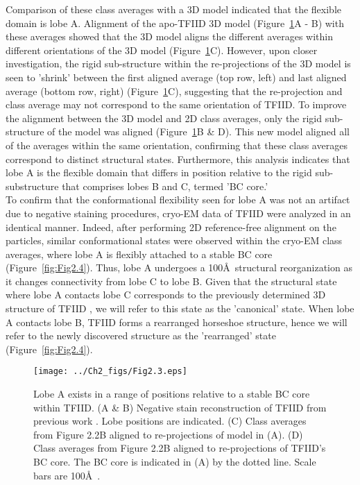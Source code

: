 \indent Comparison of these class averages with a 3D model indicated that the flexible domain is lobe A. Alignment of the apo-TFIID 3D model (Figure~\ref{fig:Fig2.3}A - B) with these averages showed that the 3D model aligns the different averages within different orientations of the 3D model (Figure~\ref{fig:Fig2.3}C). However, upon closer investigation, the rigid sub-structure within the re-projections of the 3D model is seen to 'shrink' between the first aligned average (top row, left) and last aligned average (bottom row, right) (Figure~\ref{fig:Fig2.3}C), suggesting that the re-projection and class average may not correspond to the same orientation of TFIID. To improve the alignment between the 3D model and 2D class averages, only the rigid sub-structure of the model was aligned (Figure~\ref{fig:Fig2.3}B \& D). This new model aligned all of the averages within the same orientation, confirming that these class averages correspond to distinct structural states. Furthermore, this analysis indicates that lobe A is the flexible domain that differs in position relative to the rigid sub-substructure that comprises lobes B and C, termed 'BC core.' \\
\indent To confirm that the conformational flexibility seen for lobe A was not an artifact due to negative staining procedures, cryo-EM data of TFIID were analyzed in an identical manner. Indeed, after performing 2D reference-free alignment on the particles, similar conformational states were observed within the cryo-EM class averages, where lobe A is flexibly attached to a stable BC core (Figure~\ref{fig:Fig2.4}). Thus, lobe A undergoes a 100\AA\ structural reorganization as it changes connectivity from lobe C to lobe B. Given that the structural state where lobe A contacts lobe C corresponds to the previously determined 3D structure of TFIID \cite{Andel_2407,Grob_1281}, we will refer to this state as the 'canonical' state. When lobe A contacts lobe B, TFIID forms a rearranged horseshoe structure, hence we will refer to the newly discovered structure as the 'rearranged' state (Figure~\ref{fig:Fig2.4}).\\
\begin{figure}
\centering
\texttt{[image: ../Ch2\_figs/Fig2.3.eps]}
\caption[Lobe A exists in a range of positions relative to a stable BC core within TFIID]{ Lobe A exists in a range of positions relative to a stable BC core within TFIID. (A \& B) Negative stain reconstruction of TFIID from previous work \cite{Grob_1281}.  Lobe positions are indicated. (C) Class averages from Figure 2.2B aligned to re-projections of model in (A). (D) Class averages from Figure 2.2B aligned to re-projections of TFIID's BC core. The BC core is indicated in (A) by the dotted line. Scale bars are 100\AA\ .} 
\label{fig:Fig2.3}
\end{figure}
